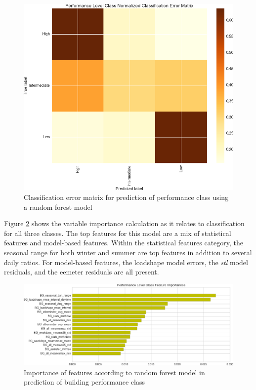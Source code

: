\begin{figure}[ht!]
\begin{center}
\includegraphics[width=1\columnwidth]{figures/ConfusionMatrixPerformanceLevelClass/ConfusionMatrixPerformanceLevelClass}
\caption{{Classification error matrix for prediction of performance class using a random forest model
\label{fig:performance_classification}%
}}
\end{center}
\end{figure}

Figure \ref{sec:featureimportance_performclass} shows the variable importance calculation as it relates to classification for all three classes. The top features for this model are a mix of statistical features and model-based features. Within the statistical features category, the seasonal range for both winter and summer are top features in addition to several daily ratios. For model-based features, the loadshape model errors, the \emph{stl} model residuals, and the eemeter residuals are all present.

\begin{figure}[ht!]
\begin{center}
\includegraphics[width=1\columnwidth]{figures/FeatureImportancePerformanceLevelClass/FeatureImportancePerformanceLevelClass}
\caption{{Importance of features according to random forest model in prediction of building performance class
\label{sec:featureimportance_performclass}%
}}
\end{center}
\end{figure}

